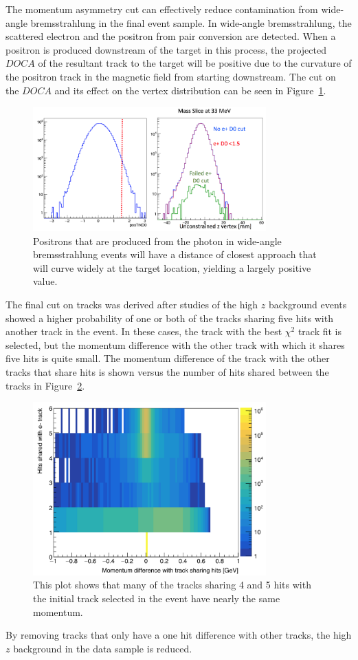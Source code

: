 The momentum asymmetry cut can effectively reduce contamination from wide-angle bremsstrahlung in the final event sample. In wide-angle bremsstrahlung, the scattered electron and the positron from pair conversion are detected. When a positron is produced downstream of the target in this process, the projected $DOCA$ of the resultant track to the target will be positive due to the curvature of the positron track in the magnetic field from starting downstream. The cut on the $DOCA$ and its effect on the vertex distribution can be seen in Figure~\ref{fig:docacut}. 

\begin{figure}[H]
  \centering
      \includegraphics[width=0.8\textwidth]{pics/searching/docacut.png}
  \caption{Positrons that are produced from the photon in wide-angle bremsstrahlung events will have a distance of closest approach that will curve widely at the target location, yielding a largely positive value.}
  \label{fig:docacut}
\end{figure} 

The final cut on tracks was derived after studies of the high $z$ background events showed a higher probability of one or both of the tracks sharing five hits with another track in the event. In these cases, the track with the best $\chi^2$ track fit is selected, but the momentum difference with the other track with which it shares five hits is quite small. The momentum difference of the track with the other tracks that share hits is shown versus the number of hits shared between the tracks in Figure~\ref{fig:trkshare}.

\begin{figure}[H]
  \centering
      \includegraphics[width=0.8\textwidth]{pics/searching/TrkShareHits.png}
  \caption{This plot shows that many of the tracks sharing 4 and 5 hits with the initial track selected in the event have nearly the same momentum.}
  \label{fig:trkshare}
\end{figure} 

By removing tracks that only have a one hit difference with other tracks, the high $z$ background in the data sample is reduced.   
